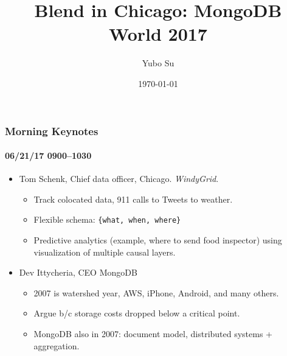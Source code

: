 \documentclass[xcolor=dvipsnames, 9pt]{beamer}
\title[MongoDB World 2017]{Blend in Chicago: MongoDB World 2017}
\author[Y. Su]{Yubo Su}
\institute[Blend]{Blend}
\date{\today}
\begin{document}
\frame{\titlepage}

\begin{frame}
    \frametitle{Morning Keynotes}
    \framesubtitle{06/21/17 0900--1030}

    \begin{itemize}
        \item Tom Schenk, Chief data officer, Chicago. \emph{WindyGrid}.
            \begin{itemize}
                \item Track colocated data, 911 calls to Tweets to
                    weather.
                \item Flexible schema: \texttt{\{what, when, where\}}
                \item Predictive analytics (example, where to send food
                    inspector) using visualization of multiple causal layers.
            \end{itemize}
        \item Dev Ittycheria, CEO MongoDB
            \begin{itemize}
                \item 2007 is watershed year, AWS, iPhone, Android, and
                    many others.
                \item Argue b/c storage costs dropped below a critical
                    point.
                \item MongoDB also in 2007: document model, distributed
                    systems + aggregation.
            \end{itemize}
    \end{itemize}
\end{frame}
\end{document}
